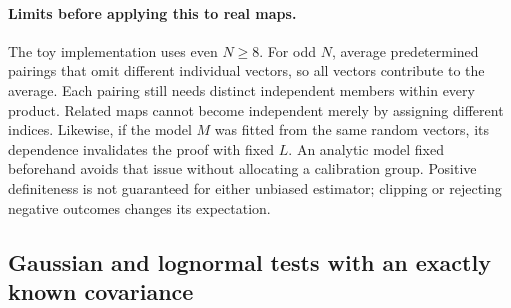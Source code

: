 \documentclass[11pt]{article}
\begin{document}
\paragraph{Limits before applying this to real maps.}
The toy implementation uses even $N\geq8$. For odd $N$, average predetermined
pairings that omit different individual vectors, so all vectors contribute
to the average. Each pairing still needs distinct independent members within
every product. Related maps cannot become independent merely by assigning
different indices. Likewise, if the model $M$ was fitted from the same random
vectors, its dependence invalidates the proof with fixed $L$. An analytic
model fixed beforehand avoids that issue without allocating a calibration
group. Positive definiteness is not guaranteed for either unbiased estimator;
clipping or rejecting negative outcomes changes its expectation.

\subsection{Gaussian and lognormal tests with an exactly known covariance}
\label{sec:fourth-toys}
\end{document}

